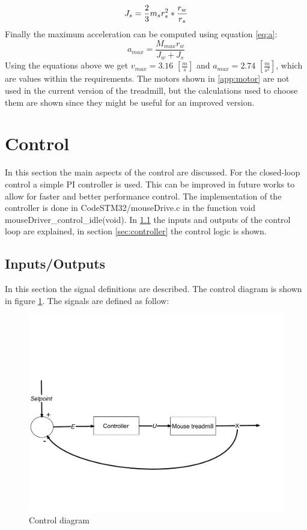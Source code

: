 \documentclass[12pt,a4paper, twoside]{article}
\begin{document}
\begin{equation}\label{eq:J_s}
J_s = \frac{2}{3}m_sr_s^2*\frac{r_w}{r_s}\\
\end{equation}
Finally the maximum acceleration can be computed using equation \ref{eq:a}:
\begin{equation}\label{eq:a}
	a_{max} = \frac{M_{max}r_w}{J_w + J_s}
\end{equation}
Using the equations above we get $v_{max} = 3.16$ $[\frac{m}{s}]$ and $a_{max} = 2.74$ $[\frac{m}{s^2}]$, which are values within the requirements. The motors shown in \ref{app:motor} are not used in the current version of the treadmill, but the calculations used to choose them are shown since they might be useful for an improved version. 
\newpage
\section{Control} \label{sec:control}
In this section the main aspects of the control are discussed.
For the closed-loop control a simple PI controller is used. This can be improved in future works to allow for faster and better performance control. The implementation of the controller is done in CodeSTM32/mouseDrive.c in the function void mouseDriver\_control\_idle(void). In \ref{sec:I/O} the inputs and outputs of the control loop are explained, in section \ref{sec:controller} the control logic is shown.

\subsection{Inputs/Outputs}\label{sec:I/O}
In this section the signal definitions are described.
The control diagram is shown in figure \ref{fig:ctrl_diag}. The signals are defined as follow:
\begin{figure}[H]
	\centering
	\includegraphics[width=0.8\linewidth]{fig/ctrl_diag.pdf}
	\caption{Control diagram}\label{fig:ctrl_diag}
\end{figure}
\end{document}
